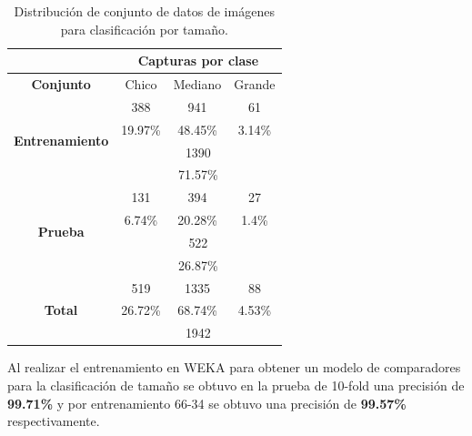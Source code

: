 \documentclass[twoside,spanish,ESP,MSc]{plantillaLabUPV}
\theoremstyle{definition}
\begin{document}
\begin{table}[!tbh]
	\caption{Distribución de conjunto de datos de imágenes para clasificación por tamaño.}
	\label{capstam}
	\centering
	\begin{tabular}{c|c|c|c|}
		\cline{2-4}
		& \multicolumn{3}{c|}{\textbf{Capturas por clase}} \\ \hline
		\multicolumn{1}{|c|}{\textbf{Conjunto}}                            & Chico           & Mediano        & Grande        \\ \hline
		\multicolumn{1}{|c|}{\multirow{4}{*}{\textbf{Entrenamiento}}} & 388             & 941            & 61            \\ \cline{2-4} 
		\multicolumn{1}{|c|}{}                                        & 19.97\%         & 48.45\%        & 3.14\%        \\ \cline{2-4} 
		\multicolumn{1}{|c|}{}                                        & \multicolumn{3}{c|}{1390}                        \\ \cline{2-4} 
		\multicolumn{1}{|c|}{}                                        & \multicolumn{3}{c|}{71.57\%}                     \\ \hline
		\multicolumn{1}{|c|}{\multirow{4}{*}{\textbf{Prueba}}}          & 131             & 394            & 27            \\ \cline{2-4} 
		\multicolumn{1}{|c|}{}                                        & 6.74\%          & 20.28\%        & 1.4\%         \\ \cline{2-4} 
		\multicolumn{1}{|c|}{}                                        & \multicolumn{3}{c|}{522}                         \\ \cline{2-4} 
		\multicolumn{1}{|c|}{}                                        & \multicolumn{3}{c|}{26.87\%}                     \\ \hline
		\multicolumn{1}{|c|}{\multirow{3}{*}{\textbf{Total}}}         & 519             & 1335           & 88            \\ \cline{2-4} 
		\multicolumn{1}{|c|}{}                                        & 26.72\%         & 68.74\%        & 4.53\%        \\ \cline{2-4} 
		\multicolumn{1}{|c|}{}                                        & \multicolumn{3}{c|}{1942}                        \\ \hline
	\end{tabular}
\end{table}

Al realizar el entrenamiento en WEKA para obtener un modelo de comparadores para la clasificación de tamaño se obtuvo en la prueba de 10-fold una precisión de \textbf{99.71\%} y por entrenamiento 66-34 se obtuvo una precisión de \textbf{99.57\%} respectivamente.
\end{document}
